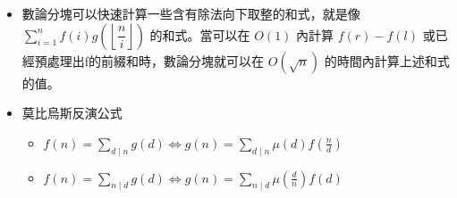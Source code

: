 \begin{itemize}
\item 數論分塊可以快速計算一些含有除法向下取整的和式，就是像 $\sum_{i = 1} ^ {n} f(i) g(\left\lfloor\dfrac ni\right\rfloor)$ 的和式。當可以在 $O(1)$ 內計算 $f(r) - f(l)$ 或已經預處理出f的前綴和時，數論分塊就可以在 $O(\sqrt n)$ 的時間內計算上述和式的值。



\item 莫比烏斯反演公式
\begin{itemize}
    \item $f(n)=\sum_{d\mid n}g(d)\Leftrightarrow g(n)=\sum_{d\mid n}\mu(d)f(\frac{n}{d})$
    \item $f(n)=\sum_{n\mid d}g(d)\Leftrightarrow g(n)=\sum_{n\mid d}\mu(\frac{d}{n})f(d)$
\end{itemize}


\end{itemize}

